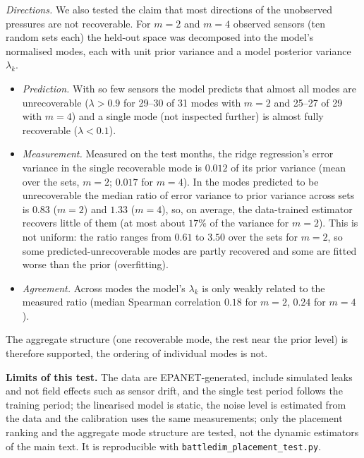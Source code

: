 \documentclass[conference]{IEEEtran}
\begin{document}
\emph{Directions.} We also tested the claim that most directions of the unobserved pressures are not recoverable. For $m=2$ and $m=4$ observed sensors (ten random sets each) the held-out space was decomposed into the model's normalised modes, each with unit prior variance and a model posterior variance $\lambda_k$.
\begin{itemize}
\item \emph{Prediction.} With so few sensors the model predicts that almost all modes are unrecoverable ($\lambda>0.9$ for 29--30 of 31 modes with $m=2$ and 25--27 of 29 with $m=4$) and a single mode (not inspected further) is almost fully recoverable ($\lambda<0.1$).
\item \emph{Measurement.} Measured on the test months, the ridge regression's error variance in the single recoverable mode is $0.012$ of its prior variance (mean over the sets, $m=2$; $0.017$ for $m=4$). In the modes predicted to be unrecoverable the median ratio of error variance to prior variance across sets is $0.83$ ($m=2$) and $1.33$ ($m=4$), so, on average, the data-trained estimator recovers little of them (at most about $17\%$ of the variance for $m=2$). This is not uniform: the ratio ranges from $0.61$ to $3.50$ over the sets for $m=2$, so some predicted-unrecoverable modes are partly recovered and some are fitted worse than the prior (overfitting).
\item \emph{Agreement.} Across modes the model's $\lambda_k$ is only weakly related to the measured ratio (median Spearman correlation $0.18$ for $m=2$, $0.24$ for $m=4$).
\end{itemize}
The aggregate structure (one recoverable mode, the rest near the prior level) is therefore supported, the ordering of individual modes is not.

\textbf{Limits of this test.} The data are EPANET-generated, include simulated leaks and not field effects such as sensor drift, and the single test period follows the training period; the linearised model is static, the noise level is estimated from the data and the calibration uses the same measurements; only the placement ranking and the aggregate mode structure are tested, not the dynamic estimators of the main text. It is reproducible with \texttt{battledim\_placement\_test.py}.

\begin{table}[t]
\centering
\caption{Placement test on the BattLeDIM pressures.}
\label{tab:field}
\small
\setlength{\tabcolsep}{3pt}
\end{table}
\end{document}

